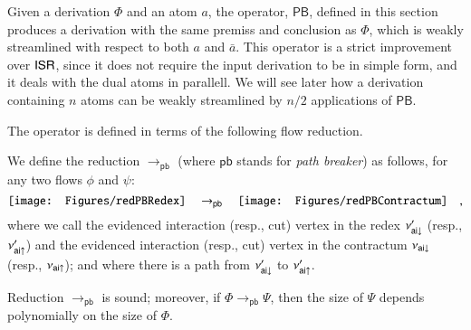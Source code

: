 \newcommand{\PB}{\mathsf{PB}}

Given a derivation $\Phi$ and an atom $a$, the operator, $\PB$, defined in this section produces a derivation with the same premiss and conclusion as $\Phi$, which is weakly streamlined with respect to both $a$ and $\bar a$. This operator is a strict improvement over $\mathsf{ISR}$, since it does not require the input derivation to be in simple form, and it deals with the dual atoms in parallell. We will see later how a derivation containing $n$ atoms can be weakly streamlined by $n/2$ applications of $\PB$.

The operator is defined in terms of the following flow reduction.

\newcommand{\frpb}{{\mathsf{pb}}}
\begin{definition}\label{definition:PathBreaker}
We define the reduction $\to_\frpb$ (where $\frpb$ stands for \emph{path breaker}) as follows, for any two flows $\phi$ and $\psi$:
\[
\vcenter{\hbox{\texttt{[image: Figures/redPBRedex]}}}
\quad\to_\frpb\quad
\vcenter{\hbox{\texttt{[image: Figures/redPBContractum]}}}
\quad,
\]
where we call the evidenced interaction (resp., cut) vertex in the redex $\nu'_{{\mathsf{ai}}{\downarrow}}$ (resp., $\nu'_{{\mathsf{ai}}{\uparrow}}$) and the evidenced interaction (resp., cut) vertex in the contractum $\nu_{{\mathsf{ai}}{\downarrow}}$ (resp., $\nu_{{\mathsf{ai}}{\uparrow}}$); and where there is a path from $\nu'_{{\mathsf{ai}}{\downarrow}}$ to $\nu'_{{\mathsf{ai}}{\uparrow}}$.
\end{definition}

\begin{theorem}\label{theorem:SoundPathBreaker}
Reduction $\to_\frpb$ is sound; moreover, if\/ $\Phi\to_\frpb\Psi$, then the size of $\Psi$ depends polynomially on the size of $\Phi$.
\end{theorem}

